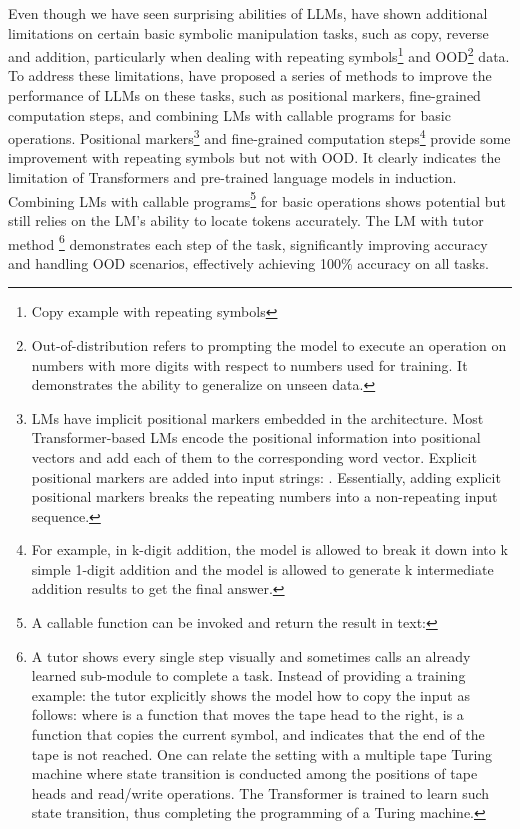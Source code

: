 Even though we have seen surprising abilities of LLMs, \textcite{qian2022limitations} have shown additional limitations on certain basic symbolic manipulation tasks, such as copy, reverse and addition, particularly when dealing with repeating symbols\footnote{Copy example with repeating symbols } and OOD\footnote{Out-of-distribution refers to prompting the model to execute an operation on numbers with more digits with respect to numbers used for training. It demonstrates the ability to generalize on unseen data.} data.
To address these limitations, \textcite{qian2022limitations} have proposed a series of methods to improve the performance of LLMs on these tasks, such as positional markers, fine-grained computation steps, and combining LMs with callable programs for basic operations.
Positional markers\footnote{LMs have implicit positional markers embedded in the architecture. Most Transformer-based LMs encode the positional information into positional vectors and add each of
	them to the corresponding word vector. Explicit positional markers are added into input strings: .
	Essentially, adding explicit positional markers breaks the repeating numbers into a non-repeating input sequence.} and fine-grained computation steps\footnote{For example, in k-digit addition, the model is allowed to break it down into k simple 1-digit addition and the model is allowed to generate k intermediate addition results to get the final answer.} provide some improvement with repeating symbols but not with OOD\@.
It clearly indicates the limitation of Transformers and pre-trained language models in induction.
Combining LMs with callable programs\footnote{A callable function  can be invoked and return the result in text: } for basic operations shows potential but still relies on the LM's ability to locate tokens accurately.
The LM with tutor method
\footnote{A tutor shows every single step visually and sometimes calls an already learned sub-module to complete a task. Instead of providing a training example:  the tutor explicitly shows the model how to copy the input as follows:  where  is a function that moves the tape head to the right,  is a function that copies the current symbol, and  indicates that the end of the tape is not reached. One can relate the setting with a multiple tape Turing machine where state transition is conducted among the positions of tape heads and read/write operations. The Transformer is trained to learn such state transition, thus completing the programming of a Turing machine.} demonstrates each step of the task, significantly improving accuracy and handling OOD scenarios, effectively achieving 100\% accuracy on all tasks.

